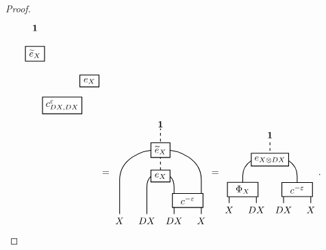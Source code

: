 \documentclass[11pt, reqno]{amsart}
\theoremstyle{definition}\newtheorem{defi}[thm]{Definition}
\theoremstyle{definition}\newtheorem{rem}[thm]{Remark}
\theoremstyle{definition}\newtheorem{exam}[thm]{Example}
\theoremstyle{definition}\newtheorem{assum}[thm]{Assumption}
\newcommand{\til}{\widetilde}
\newcommand{\vac}{\mathbf{1}}
\begin{document}
\begin{proof}
\begin{align}
\begin{matrix}
\begin{tikzpicture}[scale = 1, baseline = {(current bounding box.center)}, line width=0.75pt]
    \node at (1.5,2) [draw,minimum width=32pt,minimum height=10pt,thick, fill=white] {$c_{DX,DX}^{\varepsilon}$};
     \node at (2.5,2.9) [draw,minimum width=20pt,minimum height=10pt,thick, fill=white] {$e_X$};
      \node at (.5,3.9) [draw,minimum width=20pt,minimum height=10pt,thick, fill=white] {$\til{e}_X$};
     \node at (.5,4.85) {$\vac$};
    \end{tikzpicture}
    \end{matrix}\nonumber\\
    & =
    \begin{matrix}
    \begin{tikzpicture}[scale = 1, baseline = {(current bounding box.center)}, line width=0.75pt]
    \node at (0,1.25) {$X$};
    \node at (1,1.25) {$DX$};
    \node at (2,1.25) {$DX$}; 
    \node at (3,1.25) {$X$};
    \draw[dashed] (1.5,2.9) -- (1.5,4.65);
  \draw (0,1.5) -- (0,2.75) .. controls (0,4.25) and (3,4.25) .. (3,2.75) -- (3,1.5);
    \draw (1,1.5) -- (1,2.5) .. controls (1,3.2) and (2,3.2) .. (2,2.5) -- (2,1.5);
    \node at (2.5,2) [draw,minimum width=32pt,minimum height=10pt,thick, fill=white] {$c^{-\varepsilon}$};
     \node at (1.5,2.9) [draw,minimum width=20pt,minimum height=10pt,thick, fill=white] {$e_X$};
      \node at (1.5,3.85) [draw,minimum width=20pt,minimum height=10pt,thick, fill=white] {$\til{e}_X$};
     \node at (1.5,4.8) {$\vac$};
    \end{tikzpicture}
    \end{matrix} =
    \begin{matrix}
    \begin{tikzpicture}[scale = 1, baseline = {(current bounding box.center)}, line width=0.75pt]
    \node at (0,1.25) {$X$};
    \node at (1,1.25) {$DX$};
    \node at (2,1.25) {$DX$}; 
    \node at (3,1.25) {$X$};
    \draw (0,1.5) -- (0,2);
    \draw (1,1.5) -- (1,2);
    \draw (2,1.5) -- (2,2);
    \draw (3,1.5) -- (3,2);
    \draw[dashed] (1.5,3) -- (1.5,3.75);
  \draw (.5, 2) -- (.5,2.5) .. controls (.5, 3.5) and (2.5,3.5) .. (2.5,2.5) -- (2.5, 2);
    \node at (2.5,2) [draw,minimum width=32pt,minimum height=10pt,thick, fill=white] {$c^{-\varepsilon}$};
     \node at (.5,2) [draw,minimum width=32pt,minimum height=10pt,thick, fill=white] {$\Phi_X$};
      \node at (1.5,3.1) [draw,minimum width=20pt,minimum height=10pt,thick, fill=white] {$e_{X\otimes DX}$};
     \node at (1.5,4) {$\vac$};
    \end{tikzpicture}
    \end{matrix}.
    \end{align}

\end{proof}
\end{document}
